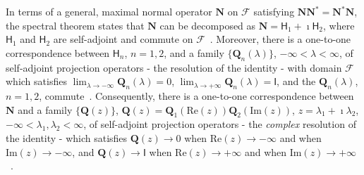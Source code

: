 \documentclass[leqno,onefignum,onetabnum]{siamltex1213}
\newcommand{\Qb}{\mathbf{Q}}
\newcommand{\Nb}{\mathbf{N}}
\newcommand{\Fc}{\mathcal{F}}
\newcommand{\Hm}{\mathsf{H}}
\newcommand{\Ib}{\mathsf{I}}
\begin{document}
In terms of a general, maximal normal operator $\Nb$ on $\Fc$
satisfying $\Nb\Nb^*=\Nb^*\Nb$, the spectral theorem states that $\Nb$ can
be decomposed as $\Nb=\Hm_1+\imath\Hm_2$, where $\Hm_1$ and $\Hm_2$ are
self-adjoint and commute on $\Fc$~\cite{Stone:64}. Moreover, there is
a one-to-one correspondence between $\Hm_n$, $n=1,2$, and a family
$\{\Qb_n(\lambda)\}$, $-\infty<\lambda<\infty$, of self-adjoint projection operators - the
resolution of the identity - with domain $\Fc$ which satisfies
$\lim_{\lambda\to-\infty}\Qb_n(\lambda)=0$, $\lim_{\lambda\to+\infty}\Qb_n(\lambda)=\Ib$, and the
$\Qb_n(\lambda)$, $n=1,2$, commute~\cite{Reed-1980,Stone:64}. Consequently,
there is a one-to-one correspondence between $\Nb$ and a family
$\{\Qb(z)\}$, 
$\Qb(z)=\Qb_1(\text{Re}(z))\Qb_2(\text{Im}(z))$, $z=\lambda_1+\imath\lambda_2$,
$-\infty<\lambda_1,\lambda_2<\infty$, of self-adjoint projection operators - the
\emph{complex} resolution of the identity - which satisfies $\Qb(z)\to0$
when $\text{Re}(z)\to-\infty$  and when $\text{Im}(z)\to-\infty$, and $\Qb(z)\to\Ib$
when $\text{Re}(z)\to+\infty$ and when $\text{Im}(z)\to+\infty$~\cite{Stone:64}.
\end{document}
